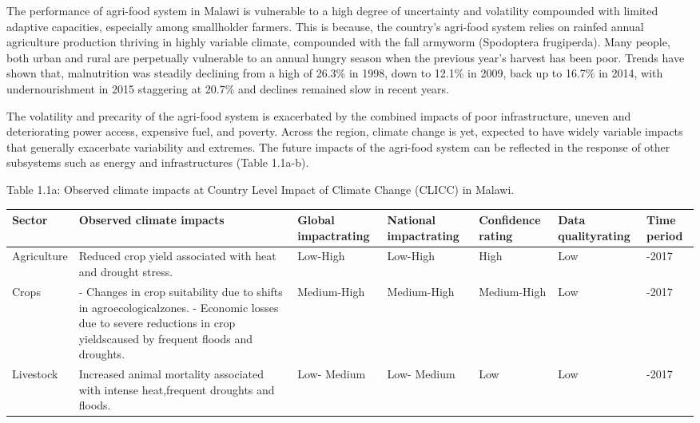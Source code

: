 \documentclass[
]{book}
\begin{document}
The performance of agri-food system in Malawi is vulnerable to a high degree of uncertainty and volatility compounded with limited adaptive capacities, especially
among smallholder farmers. This is because, the country's agri-food system relies on rainfed annual agriculture production thriving in highly variable climate,
compounded with the fall armyworm (Spodoptera frugiperda). Many people, both urban and rural are perpetually vulnerable to an annual hungry season when the previous
year's harvest has been poor. Trends have shown that, malnutrition was steadily declining from a high of 26.3\% in 1998, down to 12.1\% in 2009, back up to 16.7\% in
2014, with undernourishment in 2015 staggering at 20.7\% and declines remained slow in recent years.

The volatility and precarity of the agri-food system is exacerbated by the combined impacts of poor infrastructure, uneven and deteriorating power access, expensive
fuel, and poverty. Across the region, climate change is yet, expected to have widely variable impacts that generally exacerbate variability and extremes. The future
impacts of the agri-food system can be reflected in the response of other subsystems such as energy and infrastructures (Table 1.1a-b).

Table 1.1a: Observed climate impacts at Country Level Impact of Climate Change (CLICC) in Malawi.

\begin{longtable}[]{@{}
  >{\raggedright\arraybackslash}p{}
  >{\raggedright\arraybackslash}p{}
  >{\raggedright\arraybackslash}p{}
  >{\raggedright\arraybackslash}p{}
  >{\raggedright\arraybackslash}p{}
  >{\raggedright\arraybackslash}p{}
  >{\raggedright\arraybackslash}p{}@{}}
\toprule
Sector & Observed climate impacts & Global impactrating & National impactrating & Confidence rating & Data qualityrating & Time period \\
\midrule
\endhead
Agriculture & Reduced crop yield associated with heat and drought stress. & Low-High & Low-High & High & Low & 1992-2017 \\
Crops & - Changes in crop suitability due to shifts in agroecologicalzones. - Economic losses due to severe reductions in crop yieldscaused by frequent floods and droughts. & Medium-High & Medium-High & Medium-High & Low & 1992-2017 \\
Livestock & Increased animal mortality associated with intense heat,frequent droughts and floods. & Low- Medium & Low- Medium & Low & Low & 1992-2017 \\
\bottomrule
\end{longtable}
\end{document}
